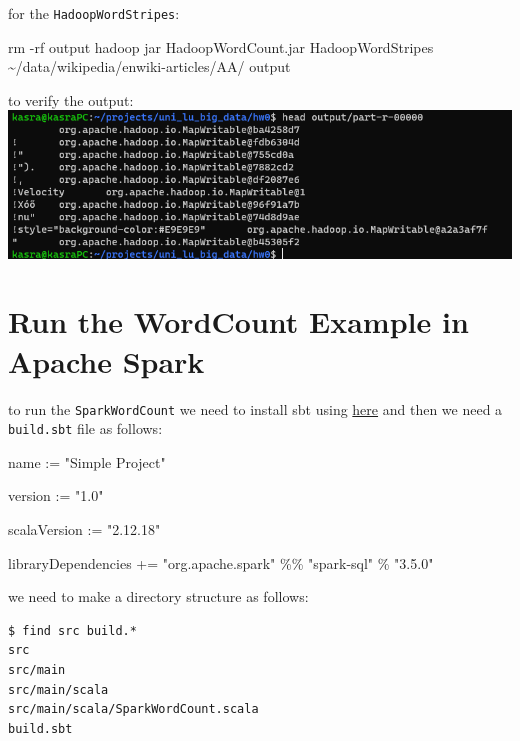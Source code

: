 \documentclass[
]{article}
\newenvironment{Shaded}{}{}
\newcommand{\ExtensionTok}[1]{#1}
\newcommand{\FunctionTok}[1]{\textcolor[rgb]{0.02,0.16,0.49}{#1}}
\newcommand{\NormalTok}[1]{#1}
\newcommand{\StringTok}[1]{\textcolor[rgb]{0.25,0.44,0.63}{#1}}
\begin{document}
for the \texttt{HadoopWordStripes}:

\begin{Shaded}
\begin{Highlighting}[]
\FunctionTok{rm}\NormalTok{ {-}rf output}
\ExtensionTok{hadoop}\NormalTok{ jar HadoopWordCount.jar HadoopWordStripes \textasciitilde{}/data/wikipedia/enwiki{-}articles/AA/ output}
\end{Highlighting}
\end{Shaded}

to verify the output:\\
\includegraphics{image-9.png}

\hypertarget{run-the-wordcount-example-in-apache-spark}{%
\section{Run the WordCount Example in Apache
Spark}\label{run-the-wordcount-example-in-apache-spark}}

to run the \texttt{SparkWordCount} we need to install sbt using
\href{https://www.scala-sbt.org/1.x/docs/Installing-sbt-on-Linux.html}{here}
and then we need a \texttt{build.sbt} file as follows:

\begin{Shaded}
\begin{Highlighting}[]
\NormalTok{name := }\StringTok{"Simple Project"}

\NormalTok{version := }\StringTok{"1.0"}

\NormalTok{scalaVersion := }\StringTok{"2.12.18"}

\NormalTok{libraryDependencies += }\StringTok{"org.apache.spark"}\NormalTok{ \%\% }\StringTok{"spark{-}sql"}\NormalTok{ \% }\StringTok{"3.5.0"}
\end{Highlighting}
\end{Shaded}

we need to make a directory structure as follows:

\begin{verbatim}
$ find src build.*
src
src/main
src/main/scala
src/main/scala/SparkWordCount.scala
build.sbt
\end{verbatim}
\end{document}
